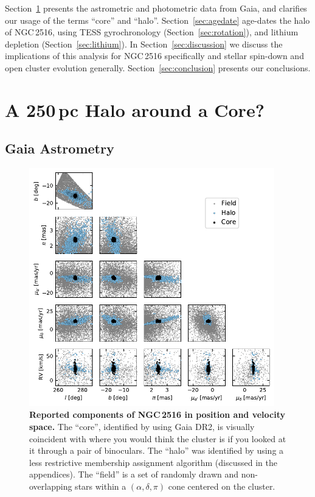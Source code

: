 \documentclass[12pt,twocolumn,tighten]{aastex63}
\begin{document}
Section~\ref{sec:gaia} presents the astrometric and photometric data
from Gaia, and clarifies our usage of the terms ``core'' and ``halo''.
Section~\ref{sec:agedate} age-dates the halo of NGC\,2516, using TESS
gyrochronology (Section~\ref{sec:rotation}), and lithium depletion
(Section~\ref{sec:lithium}).  In Section~\ref{sec:discussion} we
discuss the implications of this analysis for NGC\,2516 specifically
and stellar spin-down and open cluster evolution generally.
Section~\ref{sec:conclusion} presents our conclusions.


\section{A 250\,pc Halo around a Core?}
\label{sec:gaia}
%
%

\subsection{Gaia Astrometry}
\label{subsec:astrometry}

\begin{figure}[t]
	\begin{center}
		\leavevmode
		\includegraphics[width=0.95\textwidth]{f1.pdf}
	\end{center}
	\vspace{-0.7cm}
	\caption{ {\bf Reported components of NGC\,2516 in position and
    velocity space.}
    The ``core'', identified by \citet{cantatgaudin_gaia_2018} using
    Gaia DR2, is visually coincident
    with where you would think the cluster is if you looked at it through a pair
    of binoculars.
    The ``halo'' was identified by \citet{kounkel_untangling_2019}
    using a less restrictive membership assignment algorithm (discussed
    in the appendices).
    The ``field'' is a set of randomly drawn and non-overlapping stars
    within a
    $(\alpha, \delta, \pi)$ cone centered on the cluster.
		\label{fig:gaia6d}
	}
\end{figure}
\end{document}
